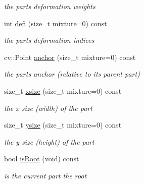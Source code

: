 \begin{DoxyCompactItemize}
\begin{DoxyCompactList}\small\item\em the part\textquotesingle{}s deformation weights \end{DoxyCompactList}\item 
int \hyperlink{classComponentPart_ae1d71f86350d8757e33bbeb1af85f4fa}{defi} (size\+\_\+t mixture=0) const 
\begin{DoxyCompactList}\small\item\em the part\textquotesingle{}s deformation indices \end{DoxyCompactList}\item 
cv\+::\+Point \hyperlink{classComponentPart_a7e2cdd67c7a6a7c66826ac9b5c4ce372}{anchor} (size\+\_\+t mixture=0) const 
\begin{DoxyCompactList}\small\item\em the part\textquotesingle{}s anchor (relative to its parent part) \end{DoxyCompactList}\item 
size\+\_\+t \hyperlink{classComponentPart_a2a0785678aa70d37132c13671204bb55}{xsize} (size\+\_\+t mixture=0) const 
\begin{DoxyCompactList}\small\item\em the x size (width) of the part \end{DoxyCompactList}\item 
size\+\_\+t \hyperlink{classComponentPart_a7db69e2def014c1b9c0e7ea9d7315354}{ysize} (size\+\_\+t mixture=0) const 
\begin{DoxyCompactList}\small\item\em the y size (height) of the part \end{DoxyCompactList}\item 
bool \hyperlink{classComponentPart_a5c2cb9582276cb9cfa11cd9ba95aac85}{is\+Root} (void) const 
\begin{DoxyCompactList}\small\item\em is the current part the root \end{DoxyCompactList}\end{DoxyCompactItemize}
